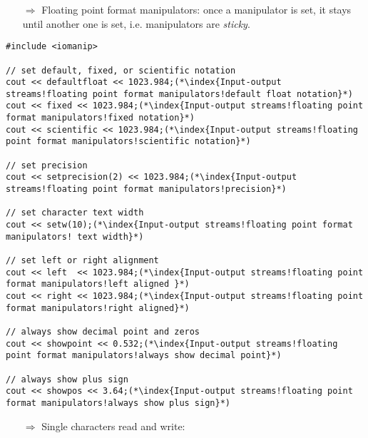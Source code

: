\documentclass[10pt]{article}
\begin{document}
\begin{enumerate}
\item[$\Rightarrow$] Floating point format manipulators:  once a  manipulator is set, it stays until another one is set, i.e. manipulators are \emph{sticky}.
\end{enumerate}
\begin{lstlisting}
#include <iomanip>

// set default, fixed, or scientific notation
cout << defaultfloat << 1023.984;(*\index{Input-output streams!floating point format manipulators!default float notation}*)
cout << fixed << 1023.984;(*\index{Input-output streams!floating point format manipulators!fixed notation}*)
cout << scientific << 1023.984;(*\index{Input-output streams!floating point format manipulators!scientific notation}*)

// set precision
cout << setprecision(2) << 1023.984;(*\index{Input-output streams!floating point format manipulators!precision}*)

// set character text width
cout << setw(10);(*\index{Input-output streams!floating point format manipulators! text width}*)

// set left or right alignment
cout << left  << 1023.984;(*\index{Input-output streams!floating point format manipulators!left aligned }*)
cout << right << 1023.984;(*\index{Input-output streams!floating point format manipulators!right aligned}*)

// always show decimal point and zeros
cout << showpoint << 0.532;(*\index{Input-output streams!floating point format manipulators!always show decimal point}*)

// always show plus sign
cout << showpos << 3.64;(*\index{Input-output streams!floating point format manipulators!always show plus sign}*)
\end{lstlisting}
\begin{enumerate}
\item[$\Rightarrow$] Single characters read and write:
\end{enumerate}
\end{document}
